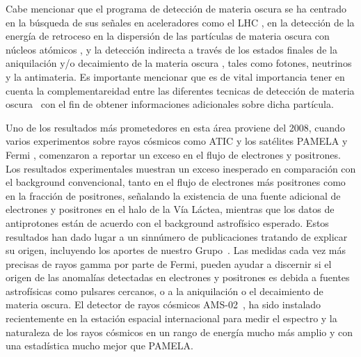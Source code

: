 Cabe mencionar que el programa de detección de materia oscura se ha
centrado en la búsqueda de sus señales en aceleradores como el LHC
\cite{Baltz:2006fm,Cho:2008tj,Nath:2010zj}, en la detección de la
energía de retroceso en la dispersión de las partículas de materia
oscura con núcleos atómicos
\cite{Green:2007rb,Bertone:2007xj,Drees:2008bv,Green:2008rd}, y la
detección indirecta a través de los estados finales de la aniquilación
y/o decaimiento de la materia oscura
\cite{Eichler:1989br,Bertone:2007aw,Arvanitaki:2008hq,Ibarra:2008jk,Ibarra:2008qg,Buckley:2009kw,Ibarra:2009tn,Ruderman:2009ta,Bernal:2010ip,Bernal:2011pz,Das:2011yr},
tales como fotones, neutrinos y la antimateria.
Es importante mencionar que es de vital importancia tener en cuenta
la complementareidad entre las diferentes tecnicas de detección
de materia oscura~\cite{Bernal:2008zk,Beltran:2008xg} con el fin de obtener
informaciones adicionales sobre dicha partícula.

Uno de los resultados más prometedores en esta área proviene del 2008, cuando
varios experimentos sobre rayos cósmicos como ATIC \cite{:2008zzr} y
los satélites PAMELA \cite{Adriani:2008zr} y Fermi
\cite{Abdo:2009zk}, comenzaron a reportar un exceso en el flujo de
electrones y positrones.
%
Los resultados experimentales muestran un exceso
inesperado en comparación con el background convencional, tanto en el
flujo de electrones más positrones como en la fracción de positrones,
señalando la existencia de una fuente adicional de electrones y
positrones en el halo de la Vía Láctea, mientras que los datos de
antiprotones están de acuerdo con el background astrofísico esperado. 
%
Estos resultados han dado lugar a un sinnúmero de publicaciones
tratando de explicar su origen, incluyendo los aportes de nuestro
Grupo~\cite{Beltran:2008xg,Nardi:2008ix,Grajek:2008pg,Barger:2009yt,
Meade:2009iu,Ibarra:2009dr,Sierra:2009zq}. Las medidas cada vez más
precisas de rayos gamma por parte de Fermi, pueden ayudar a discernir
si el origen de las anomalías detectadas en electrones y positrones es
debida a fuentes astrofísicas como pulsares cercanos, o a la
aniquilación o el decaimiento de materia oscura.
%
El detector de rayos cósmicos AMS-02~\cite{ams:2009}, ha sido
instalado recientemente en la estación espacial internacional para
medir el espectro y la naturaleza de los rayos cósmicos en un rango de energía
mucho más amplio y con una estadística mucho mejor que PAMELA.

